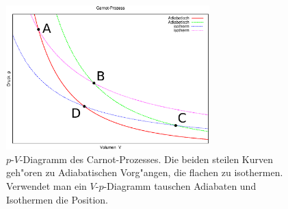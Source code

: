 \begin{figure}
   \centering
   \includegraphics[width=0.7\textwidth]{bilder/carnot1_mod1}
   \caption[Phasendiagramm: Carnot-Prozess]{$p$-$V$-Diagramm des
     Carnot-Prozesses. Die beiden steilen Kurven geh"oren zu
     Adiabatischen Vorg"angen, die flachen zu isothermen. Verwendet
     man ein $V$-$p$-Diagramm tauschen Adiabaten und Isothermen die
     Position.}
   \label{abb_carnot-prozess}
   \label{abb_isotherm-adiabatisch}
\end{figure}


